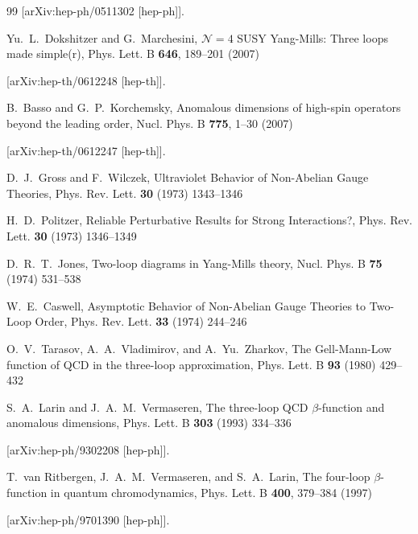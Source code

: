\documentclass[
 twocolumn,
 superscriptaddress,
 preprintnumbers,
 nofootinbib,
 amsmath,amssymb,
 aps,
 prl
 ]{revtex4-2}
\begin{document}
\begin{thebibliography}{99}
[arXiv:hep-ph/0511302 [hep-ph]].



Yu.~L.~Dokshitzer and G.~Marchesini,
$\mathcal{N}=4$ SUSY Yang-Mills: Three loops made simple(r),
Phys. Lett. B \textbf{646}, 189--201 (2007)

[arXiv:hep-th/0612248 [hep-th]].



B.~Basso and G.~P.~Korchemsky,
Anomalous dimensions of high-spin operators beyond the leading order,
Nucl. Phys. B \textbf{775}, 1--30 (2007)

[arXiv:hep-th/0612247 [hep-th]].



D.~J.~Gross and F.~Wilczek,
Ultraviolet Behavior of Non-Abelian Gauge Theories,
Phys. Rev. Lett. \textbf{30} (1973) 1343--1346




H.~D.~Politzer,
Reliable Perturbative Results for Strong Interactions?,
Phys. Rev. Lett. \textbf{30} (1973) 1346--1349




D.~R.~T.~Jones,
Two-loop diagrams in Yang-Mills theory,
Nucl. Phys. B \textbf{75} (1974) 531--538




W.~E.~Caswell,
Asymptotic Behavior of Non-Abelian Gauge Theories to Two-Loop Order,
Phys. Rev. Lett. \textbf{33} (1974) 244--246




O.~V.~Tarasov, A.~A.~Vladimirov, and A.~Yu.~Zharkov,
The Gell-Mann-Low function of QCD in the three-loop approximation,
Phys. Lett. B \textbf{93} (1980) 429--432




S.~A.~Larin and J.~A.~M.~Vermaseren,
The three-loop QCD $\beta$-function and anomalous dimensions,
Phys. Lett. B \textbf{303} (1993) 334--336

[arXiv:hep-ph/9302208 [hep-ph]].



T.~van Ritbergen, J.~A.~M.~Vermaseren, and S.~A.~Larin,
The four-loop $\beta$-function in quantum chromodynamics,
Phys. Lett. B \textbf{400}, 379--384 (1997)

[arXiv:hep-ph/9701390 [hep-ph]].




\end{thebibliography}
\end{document}
